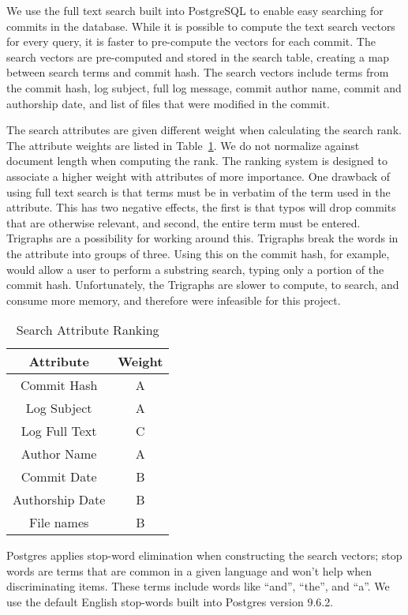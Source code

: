 We use the full text search built into PostgreSQL to enable easy
searching for commits in the database. While it is possible to compute
the text search vectors for every query, it is faster to pre-compute the
vectors for each commit. The search vectors are pre-computed and stored
in the search table, creating a map between search terms and commit
hash. The search vectors include terms from the commit hash, log
subject, full log message, commit author name, commit and authorship
date, and list of files that were modified in the commit.

The search attributes are given different weight when calculating the
search rank. The attribute weights are listed in
Table~\ref{tab:search_attribute_rank}. We do not normalize against
document length when computing the rank. The ranking system is designed
to associate a higher weight with attributes of more importance. One
drawback of using full text search is that terms must be in verbatim of
the term used in the attribute. This has two negative effects, the first
is that typos will drop commits that are otherwise relevant, and second,
the entire term must be entered. Trigraphs are a possibility for working
around this. Trigraphs break the words in the attribute into groups of
three. Using this on the commit hash, for example, would allow a user to
perform a substring search, typing only a portion of the commit hash.
Unfortunately, the Trigraphs are slower to compute, to search, and
consume more memory, and therefore were infeasible for this project.

\begin{table}[htpb]
  \centering
  \caption{Search Attribute Ranking}
  \label{tab:search_attribute_rank}
  \begin{tabular}{cc}
    \toprule
    Attribute       & Weight\\
    \midrule
    Commit Hash     & A \\
    Log Subject     & A \\
    Log Full Text   & C \\
    Author Name     & A \\
    Commit Date     & B \\
    Authorship Date & B \\
    File names      & B \\
    \bottomrule
  \end{tabular}
\end{table}

Postgres applies stop-word elimination when constructing the search
vectors; stop words are terms that are common in a given language and
won't help when discriminating items. These terms include words like
``and'', ``the'', and ``a''. We use the default English stop-words built
into Postgres version 9.6.2.

